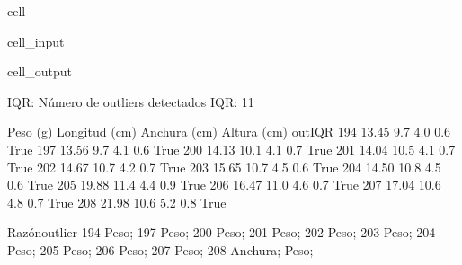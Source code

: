 \documentclass[a4paper,10pt,spanish]{jupyterBook}
\begin{document}
\begin{sphinxuseclass}{cell}
\begin{sphinxVerbatimInput}
\begin{sphinxuseclass}{cell_input}
\begin{sphinxVerbatim}[commandchars=\\\{\}]
\end{sphinxVerbatim}

\end{sphinxuseclass}\end{sphinxVerbatimInput}
\begin{sphinxVerbatimOutput}

\begin{sphinxuseclass}{cell_output}
\begin{sphinxVerbatim}[commandchars=\\\{\}]
IQR: Número de outliers detectados IQR: 11
\end{sphinxVerbatim}

\begin{sphinxVerbatim}[commandchars=\\\{\}]
     Peso (g)  Longitud (cm)  Anchura (cm)  Altura (cm)  out\PYGZus{}IQR  \PYGZbs{}
194     13.45            9.7           4.0          0.6     True
197     13.56            9.7           4.1          0.6     True
200     14.13           10.1           4.1          0.7     True
201     14.04           10.5           4.1          0.7     True
202     14.67           10.7           4.2          0.7     True
203     15.65           10.7           4.5          0.6     True
204     14.50           10.8           4.5          0.6     True
205     19.88           11.4           4.4          0.9     True
206     16.47           11.0           4.6          0.7     True
207     17.04           10.6           4.8          0.7     True
208     21.98           10.6           5.2          0.8     True

       Razón\PYGZus{}outlier
194           Peso;
197           Peso;
200           Peso;
201           Peso;
202           Peso;
203           Peso;
204           Peso;
205           Peso;
206           Peso;
207           Peso;
208  Anchura; Peso;
\end{sphinxVerbatim}

\end{sphinxuseclass}\end{sphinxVerbatimOutput}

\end{sphinxuseclass}
\end{document}
